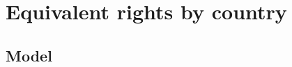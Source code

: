\documentclass[12pt,english]{article}
\theoremstyle{remark}
\begin{document}
\section{Equivalent rights by country}
\label{sec:by_country}
\label{sec:model}

\subsection{Model}
\end{document}
